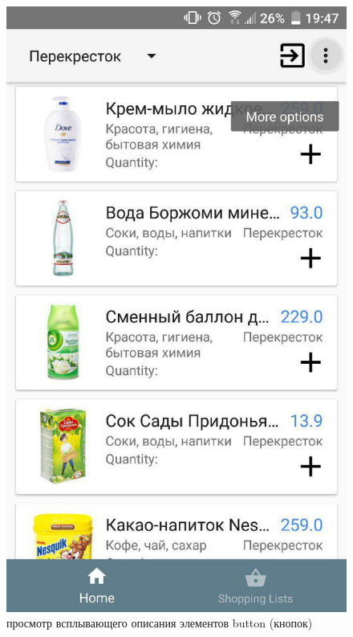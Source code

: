 \begin{figure}[h!]
    \includegraphics[height=0.35\textheight]{./screenshots/3/hint.jpg}
    \caption{\small{просмотр всплывающего описания элементов button (кнопок)}}
    \label{long_click}
    \endminipage{}
\end{figure}

\newpage

